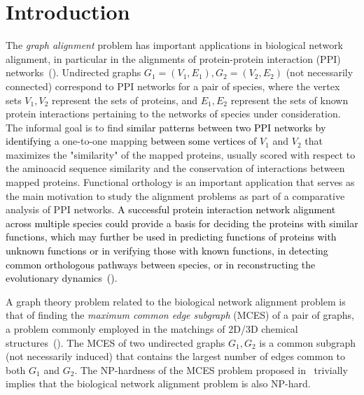\documentclass[final]{dmtcs-episciences}
\newcommand\mar[1]{\textcolor{black}{#1}}
\newcommand\fer[1]{\textcolor{black}{#1}}
\begin{document}
\section{Introduction}\label{sec:intro}
The  \emph{ graph alignment} problem has important applications in biological network alignment, in particular 
in the alignments of protein-protein interaction (PPI) 
networks~(\citet{AbakaBE13,AladagE13,sharan06,ZaslavskiyBV09,beams13}). 
Undirected graphs $G_1=(V_1,E_1), G_2=(V_2,E_2)$ (not necessarily connected) correspond to PPI networks 
for a pair of species, where  the vertex sets $V_1, V_2$ represent the sets of proteins, and 
$E_1, E_2$ represent the sets of known protein interactions pertaining to the   
networks of species under consideration. 
The informal goal is to find \mar{similar patterns between two PPI networks by identifying} a one-to-one mapping 
\mar{between some vertices of} $V_1$ and $V_2$ that maximizes the "similarity" of the mapped proteins, usually
scored with respect to the aminoacid sequence similarity and 
the conservation of interactions between mapped proteins. Functional orthology is an important application that
serves as the main motivation to study the alignment problems as part of a comparative analysis of PPI networks.  
\fer{A successful protein interaction network alignment across multiple species could provide a basis for deciding the proteins with similar functions, which may further 
be used in predicting functions of proteins with unknown functions or in verifying those with known functions, in detecting common orthologous pathways between species, or in reconstructing the evolutionary dynamics~(\citet{pmid28194172})}. 

A graph theory problem related to the biological network alignment problem is that 
of finding the  \emph{ maximum common edge subgraph} (MCES) of a pair of graphs, a problem 
commonly employed in 
the matchings of 2D/3D chemical structures~(\citet{Raymond02maximumcommon}). 
The MCES of two undirected graphs 
$G_1, G_2$ is a common subgraph (not necessarily induced) that contains the largest number of edges common to both $G_1$
and $G_2$. The NP-hardness of the MCES problem proposed in~\citet{GareyJ79} trivially implies 
that the biological network alignment problem is also NP-hard. 
\end{document}
